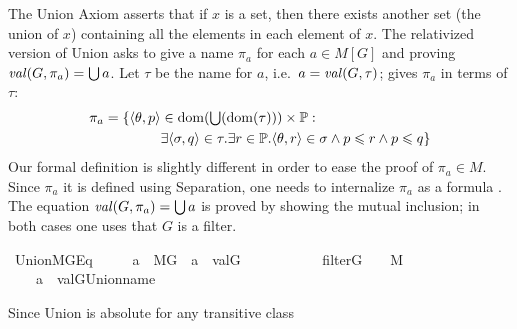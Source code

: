 The Union Axiom asserts that if $x$ is a set, then there exists
another set (the union of $x$) containing all the elements in each
element of $x$. The relativized version of Union asks to give a name
$\pi_a$ for each $a\in M[G]$ and proving $\operatorname{\mathit{val}}(G,\pi_a)=\mathop{\textstyle\bigcup} a$.
Let $\tau$ be the name for $a$, i.e.\ $a=\operatorname{\mathit{val}}(G,\tau)$; 
\citet{kunen2011set} gives $\pi_a$ in terms of $\tau$:
\begin{align*}
  \pi_a = \{\langle\theta,p \rangle &\in \operatorname{dom}(\mathop{\textstyle\bigcup}(\operatorname{dom}(\tau))) \times \mathbb{P} : \\
&\exists \langle\sigma,q\rangle  \in \tau .
 \exists r \in \mathbb{P} . \langle \theta,r\rangle \in \sigma \wedge
    p\leqslant r \wedge p \leqslant q \}
\end{align*}
Our formal definition is slightly different in order to ease the proof of
$\pi_a \in M$.  Since $\pi_a$ it is defined using Separation, one
needs to internalize $\pi_a$ as a formula
. The
equation $\operatorname{\mathit{val}}(G,\pi_a)=\mathop{\textstyle\bigcup} a$ is proved by showing the mutual
inclusion; in both cases one uses that $G$ is a filter.
\begin{isabelle}
  \isamarkupfalse%
\ Union{\isacharunderscore}MG{\isacharunderscore}Eq\ {\isacharcolon}\ \isanewline
\ \ \ {\isachardoublequoteopen}a\ {\isasymin}\ M{\isacharbrackleft}G{\isacharbrackright}{\isachardoublequoteclose}\ \ {\isachardoublequoteopen}a\ {\isacharequal}\ val{\isacharparenleft}G{\isacharcomma}{\isasymtau}{\isacharparenright}{\isachardoublequoteclose}\ \isanewline
\ \ \ \ \ \ \ \ \ \ {\isachardoublequoteopen}filter{\isacharparenleft}G{\isacharparenright}{\isachardoublequoteclose}\ \ {\isachardoublequoteopen}{\isasymtau}\ {\isasymin}\ M{\isachardoublequoteclose}\isanewline
\ \ \ {\isachardoublequoteopen}{\isasymUnion}\ a\ {\isacharequal}\ val{\isacharparenleft}G{\isacharcomma}Union{\isacharunderscore}name{\isacharparenleft}{\isasymtau}{\isacharparenright}{\isacharparenright}{\isachardoublequoteclose}
\end{isabelle}


Since Union is absolute for any transitive class
\medskip



